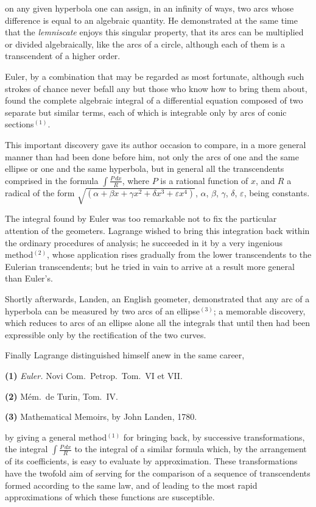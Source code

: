 \documentclass{article}
\begin{document}
on any given hyperbola one can assign, in an infinity of ways, two arcs whose difference is equal to an algebraic quantity. He demonstrated at the same time that the \emph{lemniscate} enjoys this singular property, that its arcs can be multiplied or divided algebraically, like the arcs of a circle, although each of them is a transcendent of a higher order.

Euler, by a combination that may be regarded as most fortunate, although such strokes of chance never befall any but those who know how to bring them about, found the complete algebraic integral of a differential equation composed of two separate but similar terms, each of which is integrable only by arcs of conic sections${}^{(1)}$.

This important discovery gave its author occasion to compare, in a more general manner than had been done before him, not only the arcs of one and the same ellipse or one and the same hyperbola, but in general all the transcendents comprised in the formula $\displaystyle\int\frac{P\,dx}{R}$, where $P$ is a rational function of $x$, and $R$ a radical of the form $\sqrt{(\alpha+\beta x+\gamma x^{2}+\delta x^{3}+\varepsilon x^{4})}$, $\alpha$, $\beta$, $\gamma$, $\delta$, $\varepsilon$, being constants.

The integral found by Euler was too remarkable not to fix the particular attention of the geometers. Lagrange wished to bring this integration back within the ordinary procedures of analysis; he succeeded in it by a very ingenious method${}^{(2)}$, whose application rises gradually from the lower transcendents to the Eulerian transcendents; but he tried in vain to arrive at a result more general than Euler's.

Shortly afterwards, Landen, an English geometer, demonstrated that any arc of a hyperbola can be measured by two arcs of an ellipse${}^{(3)}$; a memorable discovery, which reduces to arcs of an ellipse alone all the integrals that until then had been expressible only by the rectification of the two curves.

Finally Lagrange distinguished himself anew in the same career,

\textbf{(1)} \emph{Euler.} Novi Com.\ Petrop.\ Tom.\ VI et VII.

\textbf{(2)} Mém.\ de Turin, Tom.\ IV.

\textbf{(3)} Mathematical Memoirs, by John Landen, 1780.

by giving a general method${}^{(1)}$ for bringing back, by successive transformations, the integral $\displaystyle\int\frac{P\,dx}{R}$ to the integral of a similar formula which, by the arrangement of its coefficients, is easy to evaluate by approximation. These transformations have the twofold aim of serving for the comparison of a sequence of transcendents formed according to the same law, and of leading to the most rapid approximations of which these functions are susceptible.
\end{document}
